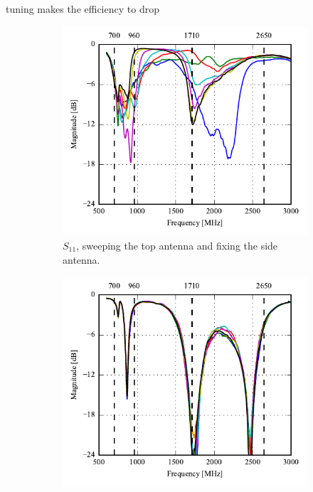 tuning makes the efficiency to drop 
\begin{figure}[htbp]
    \centering
    \begin{subfigure}{0.49\linewidth}
        \centering
        \includegraphics{img/tech_sol/nonresonant/prototype/s11_csh1.pdf}
        \caption{$S_{11}$, sweeping the top antenna and fixing the side antenna.}
    \end{subfigure}
    \hfill
    \begin{subfigure}{0.49\linewidth}
        \centering
        \includegraphics{img/tech_sol/nonresonant/prototype/s22_csh1.pdf}

\end{subfigure}
\end{figure}
